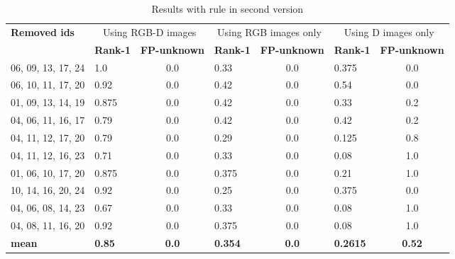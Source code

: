 \documentclass{article}
\begin{document}
\begin{table}[]
	\begin{adjustwidth}{-.75in}{-.75in}
		\centering
		\caption{Results with rule in second version}
		\label{tab:results-beta}
		\begin{tabular}{|l|l|c|l|c|l|c|}
			\hline
			\multirow{2}{*}{\bf Removed ids} & \multicolumn{2}{c|}{Using RGB-D images} &\multicolumn{2}{c|}{Using RGB images only} &\multicolumn{2}{c|}{Using D images only} \\ \cline{2-7}
							 & \bf Rank-1 & \bf FP-unknown            & \bf Rank-1 & \bf FP-unknown              & \bf Rank-1 & \bf FP-unknown  \\ \hline

			06, 09, 13, 17, 24               & 1.0        & 0.0                       & 0.33       & 0.0                         & 0.375      & 0.0\\ \hline

			06, 10, 11, 17, 20               & 0.92       & 0.0                       & 0.42       & 0.0                         & 0.54       & 0.0\\ \hline

			01, 09, 13, 14, 19               & 0.875      & 0.0                       & 0.42       & 0.0                         & 0.33       & 0.2\\ \hline

			04, 06, 11, 16, 17               & 0.79       & 0.0                       & 0.42       & 0.0                         & 0.42       & 0.2\\ \hline

			04, 11, 12, 17, 20               & 0.79       & 0.0                       & 0.29       & 0.0                         & 0.125      & 0.8\\ \hline

			04, 11, 12, 16, 23               & 0.71       & 0.0                       & 0.33       & 0.0                         & 0.08       & 1.0\\ \hline

			01, 06, 10, 17, 20               & 0.875      & 0.0                       & 0.375      & 0.0                         & 0.21       & 1.0\\ \hline

			10, 14, 16, 20, 24               & 0.92       & 0.0                       & 0.25       & 0.0                         & 0.375      & 0.0\\ \hline

			04, 06, 08, 14, 23               & 0.67       & 0.0                       & 0.33       & 0.0                         & 0.08       & 1.0\\ \hline

			04, 08, 11, 16, 20               & 0.92       & 0.0                       & 0.375      & 0.0                         & 0.08       & 1.0\\ \hline

			\bf mean                         & \bf 0.85   & \bf 0.0                   & \bf 0.354 & \bf 0.0                     & \bf 0.2615   & \bf 0.52\\ \hline
		\end{tabular}
	\end{adjustwidth}
\end{table}
\end{document}
